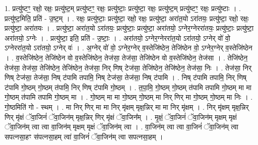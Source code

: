 \documentclass[17pt]{extarticle}
\begin{document}
1. प्रत्यु॑ष्टꣳ॒॒ रक्षो॒ रक्षः॒ प्रत्यु॑ष्ट॒म् प्रत्यु॑ष्टꣳ॒॒ रक्षः॒ प्रत्यु॑ष्टाः॒ प्रत्यु॑ष्टा॒ रक्षः॒ प्रत्यु॑ष्ट॒म् प्रत्यु॑ष्टꣳ॒॒ रक्षः॒ प्रत्यु॑ष्टाः । . प्रत्यु॑ष्ट॒मिति॒ प्रति॑ - उ॒ष्ट॒म् । . रक्षः॒ प्रत्यु॑ष्टाः॒ प्रत्यु॑ष्टा॒ रक्षो॒ रक्षः॒ प्रत्यु॑ष्टा॒ अरा॑त॒यो ऽरा॑तयः॒ प्रत्यु॑ष्टा॒ रक्षो॒ रक्षः॒ प्रत्यु॑ष्टा॒ अरा॑तयः । . प्रत्यु॑ष्टा॒ अरा॑त॒यो ऽरा॑तयः॒ प्रत्यु॑ष्टाः॒ प्रत्यु॑ष्टा॒ अरा॑तयो॒ ऽग्नेर॒ग्नेररा॑तयः॒ प्रत्यु॑ष्टाः॒ प्रत्यु॑ष्टा॒ अरा॑तयो॒ ऽग्नेः । . प्रत्यु॑ष्टा॒ इति॒ प्रति॑ - उ॒ष्टाः॒ । . अरा॑तयो॒ ऽग्नेर॒ग्नेररा॑त॒यो ऽरा॑तयो॒ ऽग्नेर् वो॑ वो॒ ऽग्नेररा॑त॒यो ऽरा॑तयो॒ ऽग्नेर् वः॑ । . अ॒ग्नेर् वो॑ वो॒ ऽग्नेर॒ग्नेर् व॒स्तेजि॑ष्ठेन॒ तेजि॑ष्ठेन वो॒ ऽग्नेर॒ग्नेर् व॒स्तेजि॑ष्ठेन । . व॒स्तेजि॑ष्ठेन॒ तेजि॑ष्ठेन वो व॒स्तेजि॑ष्ठेन॒ तेज॑सा॒ तेज॑सा॒ तेजि॑ष्ठेन वो व॒स्तेजि॑ष्ठेन॒ तेज॑सा । . तेजि॑ष्ठेन॒ तेज॑सा॒ तेज॑सा॒ तेजि॑ष्ठेन॒ तेजि॑ष्ठेन॒ तेज॑सा॒ निर् णिष् टेज॑सा॒ तेजि॑ष्ठेन॒ तेजि॑ष्ठेन॒ तेज॑सा॒ निः । . तेज॑सा॒ निर् णिष् टेज॑सा॒ तेज॑सा॒ निष् ट॑पामि तपामि॒ निष् टेज॑सा॒ तेज॑सा॒ निष् ट॑पामि । . निष् ट॑पामि तपामि॒ निर् णिष् ट॑पामि गो॒ष्ठम् गो॒ष्ठम् त॑पामि॒ निर् णिष् ट॑पामि गो॒ष्ठम् । . त॒पा॒मि॒ गो॒ष्ठम् गो॒ष्ठम् त॑पामि तपामि गो॒ष्ठम् मा मा गो॒ष्ठम् त॑पामि तपामि गो॒ष्ठम् मा । . गो॒ष्ठम् मा मा गो॒ष्ठम् गो॒ष्ठम् मा निर् णिर् मा गो॒ष्ठम् गो॒ष्ठम् मा निः । . गो॒ष्ठमिति॑ गो - स्थम् । . मा निर् णिर् मा मा निर् मृ॑क्षम् मृक्ष॒न्निर् मा मा निर् मृ॑क्षम् । . निर् मृ॑क्षम् मृक्ष॒न्निर् णिर् मृ॑क्षं ॅवा॒जिनं॑ ॅवा॒जिन॑म् मृक्ष॒न्निर् णिर् मृ॑क्षं ॅवा॒जिन᳚म् । . मृ॒क्षं॒ ॅवा॒जिनं॑ ॅवा॒जिन॑म् मृक्षम् मृक्षं ॅवा॒जिन॑म् त्वा त्वा वा॒जिन॑म् मृक्षम् मृक्षं ॅवा॒जिन॑म् त्वा । . वा॒जिन॑म् त्वा त्वा वा॒जिनं॑ ॅवा॒जिन॑म् त्वा सपत्नसा॒हꣳ स॑पत्नसा॒हम् त्वा॑ वा॒जिनं॑ ॅवा॒जिन॑म् त्वा सपत्नसा॒हम् । \newline
\end{document}
